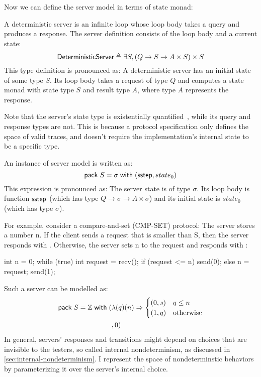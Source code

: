Now we can define the server model in terms of state monad:

\begin{definition}
  \label{def:qaserver}
  A deterministic server is an infinite loop whose loop body takes a query and
  produces a response.  The server definition consists of the loop body and a
  current state:
  \[\mathsf{DeterministicServer}\triangleq\exists S,(Q \to S \to A \times S) \times S\]
  This type definition is pronounced as: A deterministic server has an initial
  state of some type $S$.  Its loop body takes a request of type $Q$ and
  computes a state monad with state type $S$ and result type $A$, where type $A$
  represents the response.

  Note that the server's state type is existentially quantified~\cite{tapl},
  while its query and response types are not.  This is because a protocol
  specification only defines the space of valid traces, and doesn't require the
  implementation's internal state to be a specific type.

  An instance of server model is written as:
  \[\mathsf{pack}\;S=\sigma\;\mathsf{with}\;(\mathsf{sstep},state_0)\]
  This expression is pronounced as: The server state is of type $\sigma$.  Its
  loop body is function $\mathsf{sstep}$ (which has type $Q\to\sigma\to A\times\sigma$)
  and its initial state is $state_0$ (which has type $\sigma$).
\end{definition}

For example, consider a compare-and-set (CMP-SET) protocol: The server stores a
number \inlinec n.  If the client sends a request that is smaller than \inlinec
S, then the server responds with .  Otherwise, the server sets
\inlinec n to the request and responds with :

\begin{minipage}{\linewidth}
\begin{cpp}
  int n = 0;
  while (true) {
    int request = recv();
    if (request <= n) send(0);
    else { n = request; send(1); }
  }
\end{cpp}
\end{minipage}

Such a server can be modelled as:
\begin{align*}
  \mathsf{pack}\;S=\mathbb Z\;\mathsf{with}\;(&\lambda(q)(n)\Rightarrow\begin{cases}
        (0,s)&q\le n\\
        (1,q)&\mathrm{otherwise}
    \end{cases}\\
    &,0)
\end{align*}
In general, servers' responses and transitions might depend on choices that are
invisible to the testers, so called internal nondeterminism, as discussed in
\autoref{sec:internal-nondeterminism}.  I represent the space of nondeterminstic
behaviors by parameterizing it over the server's internal choice.

